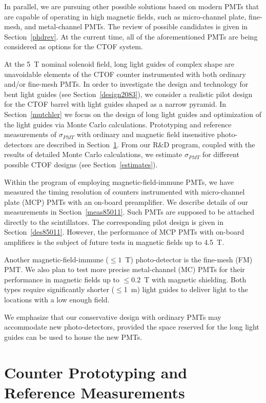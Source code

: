 In parallel, we are pursuing other possible solutions based on modern PMTs  
that are capable of operating in high magnetic fields, such as micro-channel
plate, fine-mesh, and metal-channel PMTs.  The review of possible candidates 
is given in Section~\ref{phdrev}.  At the current time, all of the aforementioned  
PMTs are being considered as options for the CTOF system. 

At the 5~T nominal solenoid field, long light guides of complex shape 
are unavoidable elements of the CTOF counter instrumented with both ordinary 
and/or fine-mesh PMTs. In order to investigate the design and technology for 
bent light guides (see Section~\ref{design2083}), we consider a realistic 
pilot design for the CTOF barrel with light guides shaped as a narrow pyramid.
In Section~\ref{mutchler} we focus on the design of long light guides and 
optimization of the light guides via Monte Carlo calculations.  Prototyping 
and reference measurements of $\sigma_{PMT}$ with ordinary and magnetic field 
insensitive photo-detectors are described in Section~\ref{measurements}.  
From our R\&D program, coupled with the results of detailed Monte Carlo 
calculations,  we estimate $\sigma_{PMT}$ for different possible CTOF 
designs (see Section~\ref{estimates}).

Within the program of employing magnetic-field-immune PMTs, we have measured 
the timing resolution of counters instrumented with micro-channel plate (MCP) 
PMTs with an on-board preamplifier.  We describe details of our measurements 
in Section~\ref{meas85011}.  Such PMTs are supposed to be attached directly to
the scintillators.  The corresponding pilot design is given in 
Section~\ref{des85011}.  However, the performance of MCP PMTs with on-board 
amplifiers is the subject of future tests in magnetic fields up to 4.5~T.

Another magnetic-field-immune ($\leq 1$~T) photo-detector is the fine-mesh
(FM) PMT.  We also plan to test more precise metal-channel (MC) PMTs for 
their performance in magnetic fields up to $\leq 0.2$~T with magnetic shielding.
Both types require significantly shorter ($\le$1~m) light guides to deliver 
light to the locations with a low enough field.

We emphasize that our conservative design with ordinary PMTs may accommodate 
new photo-detectors, provided the space reserved for the long light guides can 
be used to house the new PMTs.

\section{Counter Prototyping and Reference Measurements}
\label{measurements}

